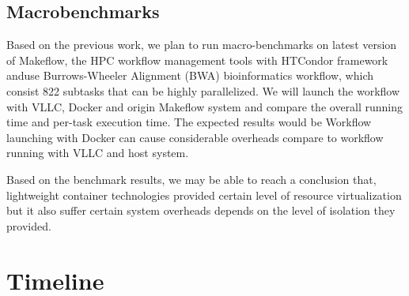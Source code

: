 \documentclass{article}
\begin{document}
\subsection{Macrobenchmarks}

Based on the previous work\cite{zheng2015integrating}, we plan to run macro-benchmarks on latest version of Makeflow, 
the HPC workflow management tools with HTCondor framework anduse Burrows-Wheeler Alignment (BWA) 
bioinformatics workflow, which consist 822 subtasks that can be highly parallelized. We will launch 
the workflow with VLLC, Docker and origin Makeflow system and compare the overall running time and per-task execution time.
The expected results would be Workflow launching with Docker can cause considerable overheads compare to workflow
running with VLLC and host system.

\medskip

Based on the benchmark results, we may be able to reach a conclusion that, lightweight container technologies 
provided certain level of resource virtualization but it also suffer certain system overheads depends on the level
of isolation they provided.

\section{Timeline}






\end{document}
